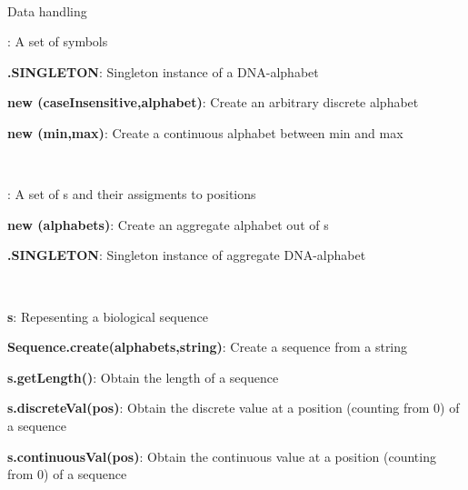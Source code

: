 \documentclass[10pt]{scrartcl}
\newcommand{\entry}[3]{{\bfseries #1#2}: #3}
\begin{document}
\thispagestyle{empty}


\renewcommand{\section}[1]{{
~\vspace{-0.1cm}

\large\sfb #1\vspace{0.1cm}\\}


}
\begin{flushleft}
\footnotesize
\section{Data handling}

\entry{\Alphabet}{}{A set of symbols}

\entry{\DNAAlphabet}{.SINGLETON}{Singleton instance of a DNA-alphabet}

\entry{new \DiscreteAlphabet}{(caseInsensitive,alphabet)}{Create an arbitrary discrete alphabet}

\entry{new \ContinuousAlphabet}{(min,max)}{Create a continuous alphabet between min and max}

~

\entry{\AlphabetContainer}{}{A set of \Alphabet s and their assigments to positions}

\entry{new \AlphabetContainer}{(alphabets)}{Create an aggregate alphabet out of \Alphabet s}

\entry{\DNAAlphabetContainer}{.SINGLETON}{Singleton instance of aggregate DNA-alphabet}


~

\entry{\Sequence}{ s}{Repesenting a biological sequence}

\entry{Sequence}{.create(alphabets,string)}{Create a sequence from a string}

\entry{s}{.getLength()}{Obtain the length of a sequence}

\entry{s}{.discreteVal(pos)}{Obtain the discrete value at a position (counting from 0) of a sequence}

\entry{s}{.continuousVal(pos)}{Obtain the continuous value at a position (counting from 0) of a sequence}

~


\end{flushleft}
\end{document}
